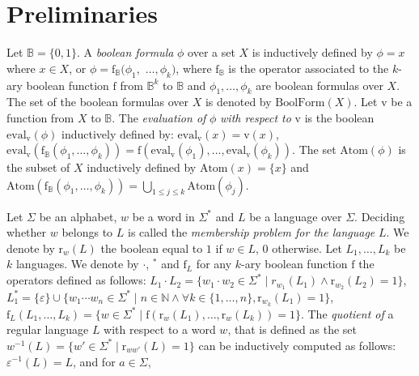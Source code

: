 \documentclass{article}
\newcommand{\Intervalle}[2]{\{#1,\ldots,#2\}}
\begin{document}
\section{Preliminaries}\label{sec prelim}

  Let $\mathbb{B}=\{0,1\}$. A \emph{boolean formula} $\phi$ over a set $X$ is inductively defined by $\phi=x$ where $x\in X$, or $\phi=\mathrm{f}_{\mathbb{B}}(\phi_1,$ $\ldots, \phi_k)$, where $\mathrm{f}_{\mathbb{B}}$ is the operator associated to the $k$-ary boolean function $\mathrm{f}$ from $\mathbb{B}^k$ to $\mathbb{B}$ and $\phi_1,\ldots,\phi_k$ are boolean formulas over $X$. The set of the boolean formulas over $X$ is denoted by $\mathrm{BoolForm}(X)$.
    Let $\mathrm{v}$ be a function from $X$ to $\mathbb{B}$. The \emph{evaluation of} $\phi$ \emph{with respect to} $\mathrm{v}$ is the boolean $\mathrm{eval}_{\mathrm{v}}(\phi)$ inductively defined by: $\mathrm{eval}_{\mathrm{v}}(x)=\mathrm{v}(x)$, $\mathrm{eval}_{\mathrm{v}}(\mathrm{f}_{\mathbb{B}}(\phi_1,\ldots,\phi_k))=\mathrm{f}(\mathrm{eval}_{\mathrm{v}}(\phi_1),\ldots,\mathrm{eval}_{\mathrm{v}}(\phi_k))$. The set $\mathrm{Atom}(\phi)$ is the subset of $X$ inductively defined by $\mathrm{Atom}(x)=\{x\}$ and $\mathrm{Atom}(\mathrm{f}_{\mathbb{B}}(\phi_1,\ldots,\phi_k))=\bigcup_{1\leq j\leq k}\mathrm{Atom}(\phi_j)$.
    
    Let $\Sigma$ be an alphabet, $w$ be a word in $\Sigma^*$ and $L$ be a language over $\Sigma$. Deciding whether $w$ belongs to $L$ is called the \emph{membership problem for the language} $L$. We denote by $\mathrm{r}_w(L)$ the boolean equal to $1$ if $w\in L$, $0$ otherwise. Let $L_1,\ldots,L_k$ be $k$ languages. We denote by $\cdot$, $^*$ and $\mathrm{f}_L$ for any $k$-ary boolean function $\mathrm{f}$ the operators defined as follows:
     $L_1\cdot L_2=\{w_1\cdot w_2 \in\Sigma^{*}\mid r_{w_1}(L_1) \wedge \mathrm{r}_{w_2}(L_2)=1\}$,
$L_1^{*}=\{\varepsilon\}\cup \{w_1\cdots w_n\in\Sigma^{*}\mid n\in\mathbb{N}\wedge \forall k\in\Intervalle{1}{n}, \mathrm{r}_{w_k}(L_1)=1\}$,     
      $\mathrm{f}_L(L_1,\ldots,L_k)=\{w\in \Sigma^{*}\mid \mathrm{f}(\mathrm{r}_w(L_1),\ldots,\mathrm{r}_w(L_k))=1\}$. The \emph{quotient of} a regular language $L$ with respect to a word $w$, that is defined as the set $w^{-1}(L)=\{w'\in\Sigma^* \mid \mathrm{r}_{ww'}(L)=1\}$ can be inductively computed as follows: 
$\varepsilon^{-1}(L)=L$,  and for $a\in \Sigma$,
\end{document}
